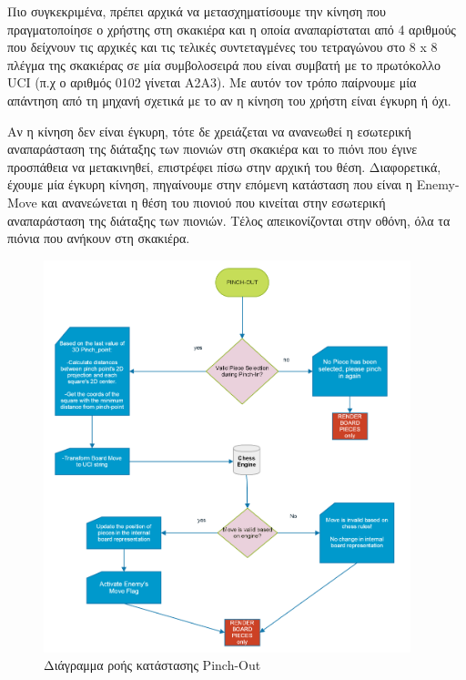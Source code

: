 Πιο συγκεκριμένα, πρέπει αρχικά να μετασχηματίσουμε την κίνηση που πραγματοποίησε ο χρήστης στη σκακιέρα και η οποία αναπαρίσταται από 4 αριθμούς που δείχνουν τις αρχικές και τις τελικές συντεταγμένες του τετραγώνου στο 8 x 8 πλέγμα της σκακιέρας σε μία συμβολοσειρά που είναι συμβατή με το πρωτόκολλο UCI (π.χ ο αριθμός 0102 γίνεται A2A3). Με αυτόν τον τρόπο παίρνουμε μία απάντηση από τη μηχανή σχετικά με το αν η κίνηση του χρήστη είναι έγκυρη ή όχι. 


Αν η κίνηση δεν είναι έγκυρη, τότε δε χρειάζεται να ανανεωθεί η εσωτερική αναπαράσταση της διάταξης των πιονιών στη σκακιέρα και το πιόνι που έγινε προσπάθεια να μετακινηθεί, επιστρέφει πίσω στην αρχική του θέση. Διαφορετικά, έχουμε μία έγκυρη κίνηση, πηγαίνουμε στην επόμενη κατάσταση που είναι η Enemy-Move και ανανεώνεται η θέση του πιονιού που κινείται στην εσωτερική αναπαράσταση της διάταξης των πιονιών. Τέλος απεικονίζονται στην οθόνη, όλα τα πιόνια που ανήκουν στη σκακιέρα.


\begin{figure}[H]
    \centering
    \includegraphics[width=0.95\textwidth]{Files/Figures/pinch_out.png}
    \caption[Διάγραμμα ροής κατάστασης Pinch-Out]{Διάγραμμα ροής κατάστασης Pinch-Out}
    \label{fig:pinch_out}
\end{figure}



